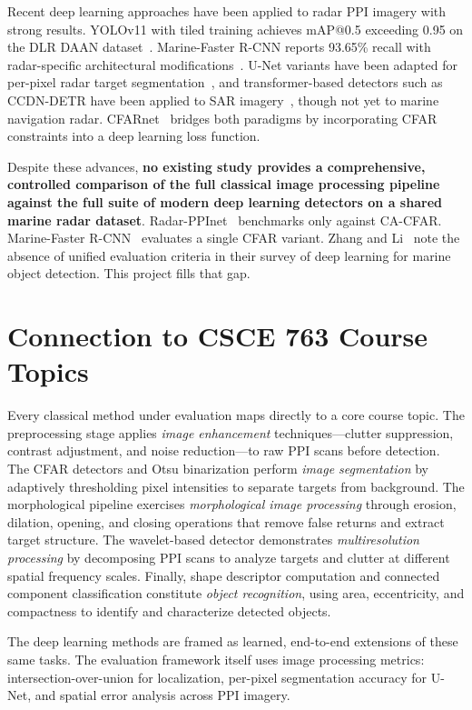 \documentclass[conference]{IEEEtran}
\begin{document}
Recent deep learning approaches have been applied to radar PPI imagery with strong results. YOLOv11 with tiled training achieves mAP@0.5 exceeding 0.95 on the DLR DAAN dataset~\cite{Heuer2025}. Marine-Faster R-CNN reports 93.65\% recall with radar-specific architectural modifications~\cite{Chen2022}. U-Net variants have been adapted for per-pixel radar target segmentation~\cite{Onet2025}, and transformer-based detectors such as CCDN-DETR have been applied to SAR imagery~\cite{CCDNDETR2024}, though not yet to marine navigation radar. CFARnet~\cite{Diskin2024} bridges both paradigms by incorporating CFAR constraints into a deep learning loss function.

Despite these advances, \textbf{no existing study provides a comprehensive, controlled comparison of the full classical image processing pipeline against the full suite of modern deep learning detectors on a shared marine radar dataset}. Radar-PPInet~\cite{Chen2021} benchmarks only against CA-CFAR. Marine-Faster R-CNN~\cite{Chen2022} evaluates a single CFAR variant. Zhang and Li~\cite{Zhang2021} note the absence of unified evaluation criteria in their survey of deep learning for marine object detection. This project fills that gap.

\section{Connection to CSCE 763 Course Topics}

Every classical method under evaluation maps directly to a core course topic. The preprocessing stage applies \textit{image enhancement} techniques---clutter suppression, contrast adjustment, and noise reduction---to raw PPI scans before detection. The CFAR detectors and Otsu binarization perform \textit{image segmentation} by adaptively thresholding pixel intensities to separate targets from background. The morphological pipeline exercises \textit{morphological image processing} through erosion, dilation, opening, and closing operations that remove false returns and extract target structure. The wavelet-based detector demonstrates \textit{multiresolution processing} by decomposing PPI scans to analyze targets and clutter at different spatial frequency scales. Finally, shape descriptor computation and connected component classification constitute \textit{object recognition}, using area, eccentricity, and compactness to identify and characterize detected objects.

The deep learning methods are framed as learned, end-to-end extensions of these same tasks. The evaluation framework itself uses image processing metrics: intersection-over-union for localization, per-pixel segmentation accuracy for U-Net, and spatial error analysis across PPI imagery.
\end{document}
